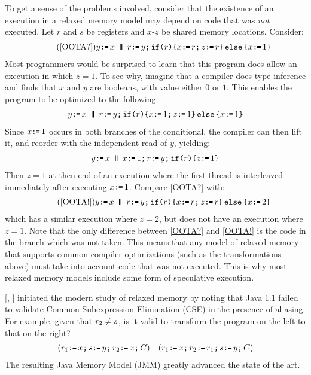 To get a sense of the problems involved,
consider that the existence of an execution in a relaxed memory model may
depend on code that was \emph{not} executed. Let $r$ and $s$ be registers and
$x$-$z$ be shared memory locations.  Consider:
\begin{gather}
  \tag{\ref{OOTA?}}
    y\GETS x
  \PAR
  r\GETS y\SEMI\IF{r}\THEN 
  x\GETS r\SEMI z\GETS r \ELSE x\GETS1 \FI
\end{gather}
Most programmers would be surprised to learn that this program does allow an
execution in which $z=1$. To see why, imagine that a compiler does type
inference and finds that $x$ and $y$ are booleans, with value either $0$ or
$1$.  This enables the program to be optimized to the following:
\begin{gather*}
    y\GETS x
  \PAR
  r\GETS y\SEMI\IF{r}\THEN 
  x\GETS 1\SEMI z\GETS 1 \ELSE x\GETS1 \FI
\end{gather*}
Since $x\texttt{:}\mkern-1mu\texttt{=}\,1$ occurs in both branches of the conditional, the compiler can
then lift it, and reorder with the independent read of $y$, yielding:
\begin{gather*}
    y\GETS x
  \PAR
  x\GETS1\SEMI
  r\GETS y\SEMI\IF{r}\THEN z\GETS 1 \FI
\end{gather*}
Then $z=1$ at then end of an execution where the first thread is interleaved
immediately after executing $x\texttt{:}\mkern-1mu\texttt{=}\,1$.  Compare \eqref{OOTA?} with:
\begin{gather}
  \tag{\ref{OOTA!}}
    y\GETS x
  \PAR
  r\GETS y\SEMI \IF{r}\THEN 
  x\GETS r\SEMI z\GETS r \ELSE x\GETS2 \FI
\end{gather}
which has a similar execution where $z=2$, but does not have an execution
where $z=1$. Note that the only difference between \eqref{OOTA?} and
\eqref{OOTA!} is the code in the branch which was not taken. This means that
any model of relaxed memory that supports common compiler optimizations (such
as the transformations above) must take into account code that was not
executed. This is why most relaxed memory models include some form of
speculative execution.



\citeauthor{DBLP:conf/java/Pugh99} [\citeyear{DBLP:conf/java/Pugh99},
] initiated the modern study of relaxed memory by noting that
Java 1.1 failed to validate Common Subexpression Elimination (CSE) in the
presence of aliasing. For example, given that $r_2\neq s$, is it valid
to transform the program on the left to that on the right?
\begin{align*}
  ({r_1\texttt{:}\mkern-1mu\texttt{=}\, x \texttt{;}\,\allowbreak
  s\texttt{:}\mkern-1mu\texttt{=}\, y \texttt{;}\,\allowbreak  
  r_2\texttt{:}\mkern-1mu\texttt{=}\, x\texttt{;}\,\allowbreak C})
&&
  ({r_1\texttt{:}\mkern-1mu\texttt{=}\, x \texttt{;}\,\allowbreak     
    r_2\texttt{:}\mkern-1mu\texttt{=}\, r_1\texttt{;}\,\allowbreak
    s\texttt{:}\mkern-1mu\texttt{=}\, y \texttt{;}\,\allowbreak C})
\end{align*}
The resulting Java Memory Model (JMM) \cite{Manson:2005:JMM:1047659.1040336}
greatly advanced the state of the art.


